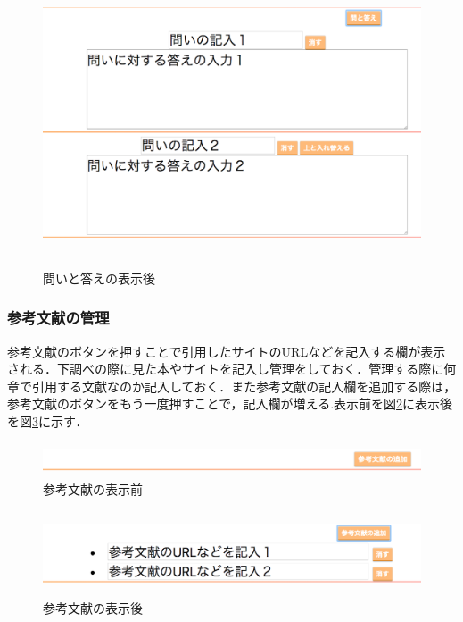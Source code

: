 \documentclass[a4j,12pt]{jarticle}
\begin{document}
\begin{figure}[h]
\begin{center}
 \includegraphics[clip,width=130mm,height=85mm]{figure/05qanda.png}
\end{center}
 \caption{問いと答えの表示後}
 \label{fig:m}
\end{figure}
\newpage

\subsubsection{参考文献の管理}
参考文献のボタンを押すことで引用したサイトのURLなどを記入する欄が表示される．下調べの際に見た本やサイトを記入し管理をしておく．管理する際に何章で引用する文献なのか記入しておく．また参考文献の記入欄を追加する際は，参考文献のボタンをもう一度押すことで，記入欄が増える.表示前を図\ref{fig:n}に表示後を図\ref{fig:o}に示す．

\begin{figure}[h]
\begin{center}
 \includegraphics[clip,width=150mm,height=10mm]{figure/06sankou.png}
\end{center}
 \caption{参考文献の表示前}
 \label{fig:n}
\end{figure}

\begin{figure}[h]
\begin{center}
 \includegraphics[clip,width=150mm,height=25mm]{figure/07sankou.png}
\end{center}
 \caption{参考文献の表示後}
 \label{fig:o}
\end{figure}
\end{document}
